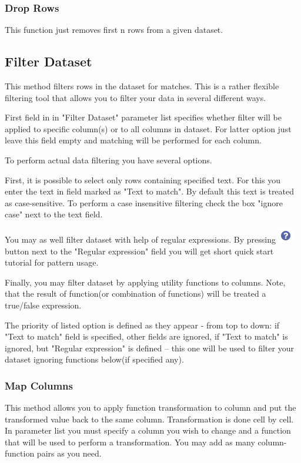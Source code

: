 \documentclass[USenglish]{article}
\begin{document}
\subsubsection{Drop Rows}
This function just removes first n rows from a given dataset.
\subsection{Filter Dataset}
This method filters rows in the dataset for matches. This is a rather flexible filtering tool that allows you to filter your data in several different ways.

First field in in "Filter Dataset" parameter list specifies whether filter will be applied to specific column(s) or to all columns in dataset. For latter option just leave this field empty and matching will be performed for each column.

To perform actual data filtering you have several options.

First, it is possible to select only rows containing specified text. For this you enter the text in field marked as "Text to match". By default this text is treated as case-sensitive. To perform a case insensitive filtering check the box "ignore case" next to the text field.

You may as well filter dataset with help of regular expressions. By pressing {\includegraphics[scale=0.6]{tutorial.png}} button next to the "Regular expression" field  you will get short quick start tutorial for pattern usage.

Finally, you may filter dataset by applying utility functions to columns. Note, that the result of function(or combination of functions) will be treated a true/false expression.

The priority of listed option is defined as they appear - from top to down: if "Text to match" field is specified, other fields are ignored, if "Text to match" is ignored, but "Regular expression" is defined -- this one will be used to filter your dataset ignoring functions below(if specified any).

\subsubsection{Map Columns}
This method allows you to apply function transformation to column and put the transformed value back to the same column. Transformation is done cell by cell. In parameter list you must specify a column you wish to change and a function that will be used to perform a transformation. You may add as many column-function pairs as you need. 
\end{document}
